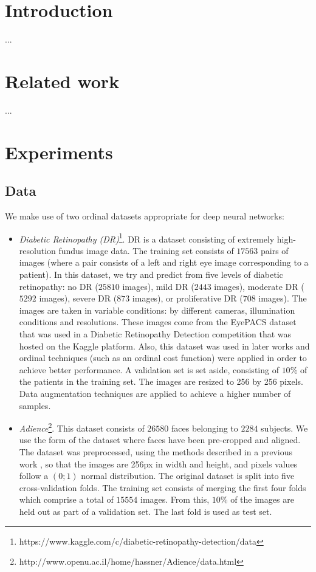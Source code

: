 \documentclass[10pt, a4paper, titlepage, twocolumn]{article}
\begin{document}
	\selectfont
	
		
	\section{Introduction}
	...
		
	\section{Related work}
	...

	
	\section{Experiments}
	\subsection{Data}
	We make use of two ordinal datasets appropriate for deep neural networks:
	
	\begin{itemize}
		\item \textit{Diabetic Retinopathy (DR)}\footnote{https://www.kaggle.com/c/diabetic-retinopathy-detection/data}. DR is a dataset consisting of extremely high-resolution fundus image data. The training set consists of $17563$ pairs of images (where a  pair consists of a left and right eye image corresponding to a patient). In this dataset, we try and predict from five levels of diabetic retinopathy: no DR ($25810$ images), mild DR ($2443$ images), moderate DR ($5292$ images), severe DR ($873$ images), or proliferative DR ($708$ images). The images are taken in variable conditions: by different cameras, illumination conditions and resolutions. These images come from the EyePACS dataset that was used in a Diabetic Retinopathy Detection competition that was hosted on the Kaggle platform. Also, this dataset was used in later works \cite{de2018weighted}\cite{nebot2016diabetic} and ordinal techniques (such as an ordinal cost function) were applied in order to achieve better performance. A validation set is set aside, consisting of $10\%$ of the patients in the training set. The images are resized to 256 by 256 pixels. Data augmentation techniques are applied to achieve a higher number of samples.
		
		\item \textit{Adience}\footnote{http://www.openu.ac.il/home/hassner/Adience/data.html}. This dataset consists of $26580$ faces belonging to $2284$ subjects. We use the form of the dataset where faces have been pre-cropped and aligned. The dataset was preprocessed, using the methods described in a previous work \cite{beckham2017unimodal}, so that the images are 256px in width and height, and pixels values follow a $(0;1)$ normal distribution. The original dataset is split into five cross-validation folds. The training set consists of merging the first four folds which comprise a total of $15554$ images. From this, $10\%$ of the images are held out as part of a validation set. The last fold is used as test set.
	\end{itemize}
	
\end{document}
